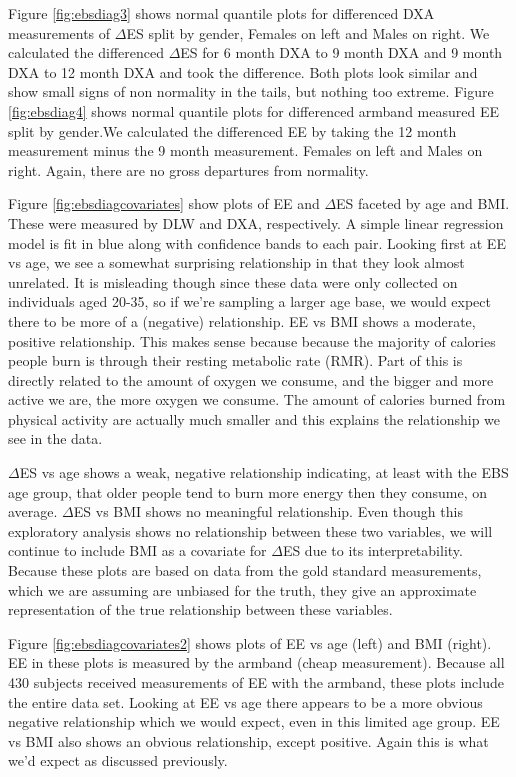 \documentclass[11pt]{article}\usepackage[]{graphicx}\usepackage[]{color}
\begin{document}
Figure \ref{fig:ebsdiag3} shows normal quantile plots for differenced DXA measurements of $\Delta$ES split by gender, Females on left and Males on right. We calculated the differenced $\Delta$ES for 6 month DXA to 9 month DXA and 9 month DXA to 12 month DXA and took the difference. Both plots look similar and show small signs of non normality in the tails, but nothing too extreme. Figure \ref{fig:ebsdiag4} shows normal quantile plots for differenced armband measured EE split by gender.We calculated the differenced EE by taking the 12 month measurement minus the 9 month measurement. Females on left and Males on right. Again, there are no gross departures from normality. 

Figure \ref{fig:ebsdiagcovariates} show plots of EE and $\Delta$ES faceted by age and BMI. These were measured by DLW and DXA, respectively. A simple linear regression model is fit in blue along with confidence bands to each pair. Looking first at EE vs age, we see a somewhat surprising relationship in that they look almost unrelated. It is misleading though since these data were only collected on individuals aged 20-35, so if we're sampling a larger age base, we would expect there to be more of a (negative) relationship. EE vs BMI shows a moderate, positive relationship. This makes sense because because the majority of calories people burn is through their resting metabolic rate (RMR). Part of this is directly related to the amount of oxygen we consume, and the bigger and more active we are, the more oxygen we consume. The amount of calories burned from physical activity are actually much smaller and this explains the relationship we see in the data.

$\Delta$ES vs age shows a weak, negative relationship indicating, at least with the EBS age group, that older people tend to burn more energy then they consume, on average. $\Delta$ES vs BMI shows no meaningful relationship. Even though this exploratory analysis shows no relationship between these two variables, we will continue to include BMI as a covariate for $\Delta$ES due to its interpretability. Because these plots are based on data from the gold standard measurements, which we are assuming are unbiased for the truth, they give an approximate representation of the true relationship between these variables.

Figure \ref{fig:ebsdiagcovariates2} shows plots of EE vs age (left) and BMI (right). EE in these plots is measured by the armband (cheap measurement). Because all 430 subjects received measurements of EE with the armband, these plots include the entire data set. Looking at EE vs age there appears to be a more obvious negative relationship which we would expect, even in this limited age group. EE vs BMI also shows an obvious relationship, except positive. Again this is what we'd expect as discussed previously. 
\end{document}
